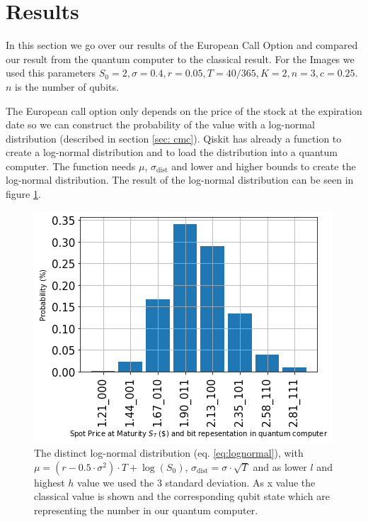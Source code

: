\documentclass[../main.tex]{subfiles}
\begin{document}
\section{Results}\label{sec: results}
In this section we go over our results of the European Call Option and compared our result from the quantum computer to the classical result. For the Images we used this parameters $S_0 = 2, \sigma = 0.4, r=0.05, T=40/365, K=2, n=3, c=0.25$. $n$ is the number of qubits.

The European call option only depends on the price of the stock at the expiration date so we can construct the probability of the value with a log-normal distribution (described in section \ref{sec: cmc}). Qiskit has already a function to create a log-normal distribution and to load the distribution into a quantum computer. The function needs $\mu$, $\sigma_{\text{dist}}$ and lower and higher bounds to create the log-normal distribution. The result of the log-normal distribution can be seen in figure \ref{fig:E_log-normal}.
\begin{figure}[H]
  \begin{center}
    \includegraphics[width=0.5\linewidth]{../../images/probability.png}
  \end{center}
  \caption{The distinct log-normal distribution (eq. \ref{eq:lognormal}), with $\mu=(r-0.5\cdot \sigma^2)\cdot T + \log(S_0)$, $\sigma_{\text{dist}}=\sigma \cdot \sqrt{T}$ and as lower $l$ and highest $h$ value we used the 3 standard deviation. As x value the classical value is shown and the corresponding qubit state which are representing the number in our quantum computer.}
  \label{fig:E_log-normal}
\end{figure}
\end{document}
